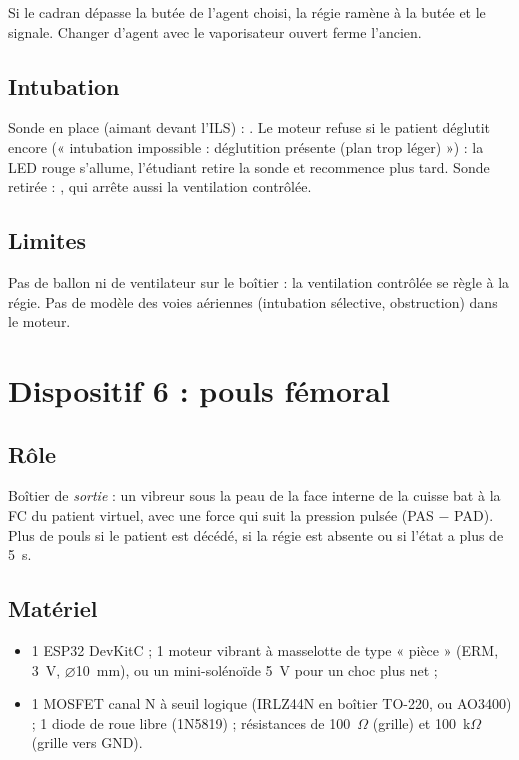 \documentclass[11pt,a4paper]{article}
\begin{document}
Si le cadran dépasse la butée de l'agent choisi, la régie ramène à la butée et le signale. Changer d'agent avec le
vaporisateur ouvert ferme l'ancien.

\subsection{Intubation}
Sonde en place (aimant devant l'ILS) : . Le moteur refuse si le patient déglutit encore (« intubation
impossible : déglutition présente (plan trop léger) ») : la LED rouge s'allume, l'étudiant retire la sonde et
recommence plus tard. Sonde retirée : , qui arrête aussi la ventilation contrôlée.

\subsection{Limites}
Pas de ballon ni de ventilateur sur le boîtier : la ventilation contrôlée se règle à la régie. Pas de modèle des
voies aériennes (intubation sélective, obstruction) dans le moteur.

\section{Dispositif 6 : pouls fémoral}
\subsection{Rôle}
Boîtier de \emph{sortie} : un vibreur sous la peau de la face interne de la cuisse bat à la FC du patient virtuel, avec
une force qui suit la pression pulsée (PAS \(-\) PAD). Plus de pouls si le patient est décédé, si la régie est absente
ou si l'état a plus de 5~s.

\subsection{Matériel}
\begin{itemize}
  \item 1 ESP32 DevKitC ; 1 moteur vibrant à masselotte de type « pièce » (ERM, 3~V, \(\varnothing\)10~mm), ou un
  mini-solénoïde 5~V pour un choc plus net ;
  \item 1 MOSFET canal N à seuil logique (IRLZ44N en boîtier TO-220, ou AO3400) ; 1 diode de roue libre (1N5819) ;
  résistances de 100~\(\Omega\) (grille) et 100~k\(\Omega\) (grille vers GND).
\end{itemize}
\end{document}
